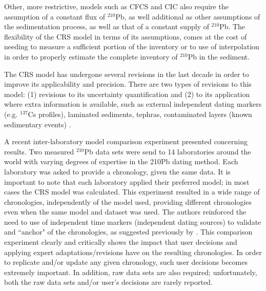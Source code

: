 \documentclass [10pt] {article}
\begin{document}
Other, more restrictive, models such as CFCS and CIC also require the assumption of a constant flux of $^{210}$Pb, as well additional as other assumptions of the sedimentation process, as well as that of a constant supply of $^{210}$Pb.
The flexibility of the CRS model in terms of its assumptions, comes at the cost of needing to measure a sufficient portion of the inventory or to use of interpolation in order to properly estimate the complete inventory of $^{210}$Pb in the sediment. 

The CRS model has undergone several revisions in the last decade in order to improve its applicability and precision. 
There are two types of revisions to this model: (1) revisions to its uncertainty quantification \citep[eg. ][]{Binford1990,Appleby2001,Sanchez-Cabeza2014} and (2) to its application where extra information is available, such as external independent dating markers (e.g. $^{137}$Cs profiles), laminated sediments, tephras, contaminated layers (known sedimentary events) \citep[eg.][]{Appleby1998,Appleby2001,Appleby2008}. 

A recent inter-laboratory model comparison experiment \citep{Barsanti2020} presented concerning results.
Two measured $^{210}$Pb data sets were send to 14 laboratories around the world with varying degrees of expertise in the 210Pb dating method.
Each laboratory was asked to provide a chronology, given the same data. 
It is important to note that each laboratory applied their preferred model; in most cases the CRS model was calculated.
This experiment resulted in a wide range of chronologies, independently of the model used, providing different chronologies even when the same model and dataset was used.
The authors reinforced the need to use of independent time markers (independent dating sources) to validate and ``anchor" of the chronologies, as suggested previously by \citep{Smith2001}.  
This comparison experiment clearly and critically shows the impact that user decisions and applying expert adaptations/revisions have on the resulting chronologies.
In order to replicate and/or update any given chronology, such user decisions becomes extremely important.
In addition, raw data sets are also required; unfortunately, both the raw data sets and/or user's decisions are rarely reported.
\end{document}
